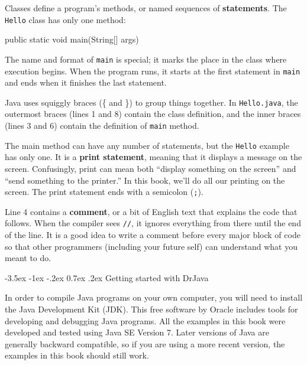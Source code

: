 \documentclass[12pt]{book}
\makeatletter
\renewcommand{\section}{\@startsection {section}{1}{\z@}%
    {-3.5ex \@plus -1ex \@minus -.2ex}%
    {0.7ex \@plus.2ex}%
    {\normalfont\Large\bfseries}}
\theoremstyle{exercise}
\newcommand{\java}[1]{\lstinline{#1}} %
\makeatother
\begin{document}

Classes define a program's methods, or named sequences of {\bf statements}.
The \java{Hello} class has only one method:

\begin{code}
    public static void main(String[] args)
\end{code}

The name and format of \java{main} is special; it marks the place in the class where execution begins.
When the program runs, it starts at the first statement in \java{main} and ends when it finishes the last statement.


Java uses squiggly braces (\{ and \}) to group things together.
In {\tt Hello.java}, the outermost braces (lines 1 and 8) contain the class definition, and the inner braces (lines 3 and 6) contain the definition of \java{main} method.



The main method can have any number of statements, but the \java{Hello} example has only one.
It is a {\bf print statement}, meaning that it displays a message on the screen.
Confusingly, print can mean both ``display something on the screen'' and ``send something to the printer.''
In this book, we'll do all our printing on the screen.
The print statement ends with a semicolon ({\tt ;}).


Line 4 contains a {\bf comment}, or a bit of English text that explains the code that follows.
When the compiler sees {\tt //}, it ignores everything from there until the end of the line.
It is a good idea to write a comment before every major block of code so that other programmers (including your future self) can understand what you meant to do.


\section{Getting started with DrJava}


In order to compile Java programs on your own computer, you will need to install the Java Development Kit (JDK).
This free software by Oracle includes tools for developing and debugging Java programs.
All the examples in this book were developed and tested using Java SE Version 7.
Later versions of Java are generally backward compatible, so if you are using a more recent version, the examples in this book should still work.
\end{document}
